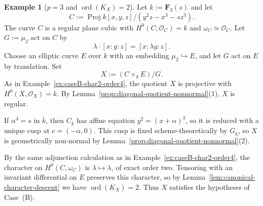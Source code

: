 \documentclass[10pt,abstract=true]{scrartcl}
\numberwithin{equation}{section}
\theoremstyle{definition}
\newtheorem{example}[theorem]{Example}
\theoremstyle{remark}
\DeclareMathOperator\Proj{Proj}
\DeclareMathOperator\ord{ord}
\begin{document}
\begin{example}[$p=3$ and $\ord(K_X)=2$]\label{ex:caseB-order2}%
  Let $k:=\mathbf F_3(s)$ and let
  \[
    C:=\Proj k[x,y,z]/(y^2z-x^3-sz^3).
  \]
  The curve $C$ is a regular plane cubic with $H^0(C,\mathcal O_C)=k$ and $\omega_C\simeq\mathcal O_C$.
  Let $G:=\mu_2$ act on $C$ by
  \[
    \lambda\cdot[x:y:z]=[x:\lambda y:z].
  \]
  Choose an elliptic curve $E$ over $k$ with an embedding $\mu_2\hookrightarrow E$, and let $G$ act on $E$ by translation.
  Set
  \[
    X:=(C\times_kE)/G.
  \]
  As in Example~\ref{ex:caseB-char2-order4}, the quotient $X$ is projective with $H^0(X,\mathcal O_X)=k$.
  By Lemma~\ref{prop:diagonal-quotient-nonnormal}\textup{(1)}, $X$ is regular.

  If $\alpha^3=s$ in $\overline{k}$, then $C_{\overline{k}}$ has affine equation $y^2=(x+\alpha)^3$, so it is reduced with a unique cusp at $c=(-\alpha,0)$.
  This cusp is fixed scheme-theoretically by $G_{\overline{k}}$, so $X$ is geometrically non-normal by Lemma~\ref{prop:diagonal-quotient-nonnormal}\textup{(2)}.

  By the same adjunction calculation as in Example~\ref{ex:caseB-char2-order4}, the character on $H^0(C,\omega_C)$ is $\lambda\mapsto\lambda$, of exact order two.
  Tensoring with an invariant differential on $E$ preserves this character, so by Lemma~\ref{lem:canonical-character-descent} we have $\ord(K_X)=2$.
  Thus $X$ satisfies the hypotheses of Case~\textup{(B)}.
\end{example}
\end{document}
